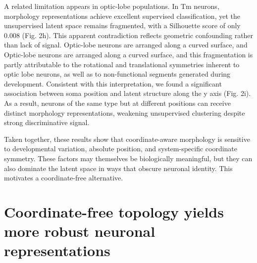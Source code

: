 \documentclass{article}
\begin{document}
A related limitation appears in optic-lobe populations. In Tm neurons, morphology representations achieve excellent supervised classification, yet the unsupervised latent space remains fragmented, with a Silhouette score of only 0.008 (Fig. 2h). This apparent contradiction reflects geometric confounding rather than lack of signal. Optic-lobe neurons are arranged along a curved surface, and Optic-lobe neurons are arranged along a curved surface, and this fragmentation is partly attributable to the rotational and translational symmetries inherent to optic lobe neurons, as well as to non-functional segments generated during development. Consistent with this interpretation, we found a significant association between soma position and latent structure along the y axis (Fig. 2i). As a result, neurons of the same type but at different positions can receive distinct morphology representations, weakening unsupervised clustering despite strong discriminative signal.

Taken together, these results show that coordinate-aware morphology is sensitive to developmental variation, absolute position, and system-specific coordinate symmetry. These factors may themselves be biologically meaningful, but they can also dominate the latent space in ways that obscure neuronal identity. This motivates a coordinate-free alternative.

\section{Coordinate-free topology yields more robust neuronal representations} 
\end{document}
